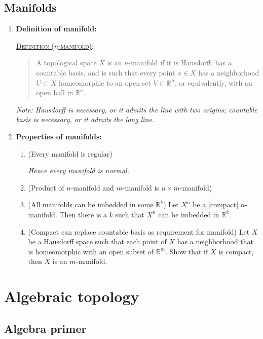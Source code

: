 \documentclass[letterpaper, 12pt]{book}
\newcommand{\RR}{\mathbb{R}}
\newcommand{\defn}[2]{\textsc{\underline{Definition (#1)}:}\begin{quote} #2\end{quote}}
\begin{document}
\chapter{Manifolds}
    \begin{enumerate}[resume]
    \item \textbf{Definition of manifold:}

        \defn{$n$-manifold}{A topological space $X$ is an $n$-manifold if it is Hausdorff, has a countable basis, and is such that every point $x\in X$ has a neighborhood $U\subset X$ homeomorphic to an open set $V\subset\RR^n$, or equivalently, with an open ball in $\RR^n$.}

        \textit{Note: Hausdorff is necessary, or it admits the line with two origins; countable basis is necessary, or it admits the long line.}
    \item \textbf{Properties of manifolds:}
        \begin{enumerate}
        \item (Every manifold is regular)

            \textit{Hence every manifold is normal.}
        \item (Product of $n$-manifold and $m$-manifold is $n\times m$-manifold)
        \item (All manifolds can be imbedded in some $\RR^k$) Let $X^n$ be a [compact] $n$-manifold. Then there is a $k$ such that $X^n$ can be imbedded in $\RR^k$. %
        \item (Compact can replace countable basis as requirement for manifold) Let $X$ be a Hausdorff space such that each point of $X$ has a neighborhood that is homeomorphic with an open subset of $\RR^m$. Show that if $X$ is compact, then $X$ is an $m$-manifold.
        \end{enumerate}
    \end{enumerate}

\part{Algebraic topology}

\chapter{Algebra primer}
\end{document}

